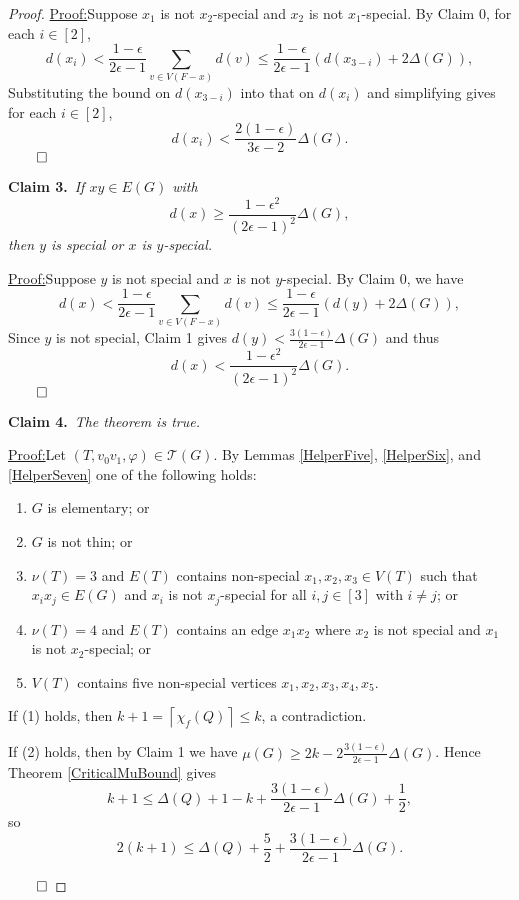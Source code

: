 \documentclass[12pt]{amsart}
\theoremstyle{plain}
\theoremstyle{definition}
\theoremstyle{remark}
\newcommand{\fancy}[1]{\mathcal{#1}}
\newcommand{\T}{\fancy{T}}
\newcommand{\ceil}[1]{\left\lceil#1\right\rceil}
\newcommand{\irange}[1]{\left[#1\right]}
\newcommand{\parens}[1]{\left( #1 \right)}
\newcommand{\vph}{\varphi}
\newcommand{\claim}[2]{{\noindent\bf Claim #1.}~{\it #2}~~}
\newenvironment{claimproof}[1]{\par\noindent\underline{Proof:}\space#1}{\leavevmode\unskip\penalty9999
\hbox{}\nobreak\hfill\quad\hbox{$\qed$}}
\begin{document}
\begin{proof}
\begin{claimproof}
Suppose $x_1$ is not $x_2$-special and $x_2$ is not $x_1$-special.  By Claim 0,
for each $i \in \irange{2}$,
\[d(x_i) < \frac{1-\epsilon}{2\epsilon -1}\sum_{v \in V(F-x)} d(v) \le
\frac{1-\epsilon}{2\epsilon -1}\parens{d(x_{3-i}) + 2\Delta(G)},\]
Substituting the bound on $d(x_{3-i})$ into that on $d(x_i)$ and simplifying
gives for each $i \in \irange{2}$,
\[d(x_i) < \frac{2(1-\epsilon)}{3\epsilon - 2}\Delta(G).\]
\end{claimproof}
\bigskip

\claim{3}{If $xy \in E(G)$ with \[d(x) \ge \frac{1 - \epsilon^2}{\parens{2\epsilon - 1}^2}\Delta(G),\] then $y$ is special or $x$ is $y$-special.}

\begin{claimproof}
Suppose $y$ is not special and $x$ is not $y$-special.  By Claim 0, we have
\[d(x) < \frac{1-\epsilon}{2\epsilon -1}\sum_{v \in V(F-x)} d(v) \le \frac{1-\epsilon}{2\epsilon -1}\parens{d(y) + 2\Delta(G)},\]
Since $y$ is not special, Claim 1 gives $d(y) < \frac{3(1-\epsilon)}{2\epsilon -1}\Delta(G)$ and thus
\[d(x) < \frac{1 - \epsilon^2}{\parens{2\epsilon - 1}^2}\Delta(G).\]
\end{claimproof}

\claim{4}{The theorem is true.}

\begin{claimproof}
Let $(T, v_0v_1, \vph) \in \T(G)$. By Lemmas \ref{HelperFive}, \ref{HelperSix},
and \ref{HelperSeven} one of the following holds:
\begin{enumerate}
\item $G$ is elementary; or
\item $G$ is not thin; or
\item $\nu(T) = 3$ and $E(T)$ contains non-special $x_1,x_2,x_3 \in V(T)$ such that $x_ix_j \in E(G)$ and $x_i$ is not $x_j$-special for all $i,j \in \irange{3}$ with $i \ne j$; or
\item $\nu(T) = 4$ and $E(T)$ contains an edge $x_1x_2$ where $x_2$ is not special and $x_1$ is not $x_2$-special; or
\item $V(T)$ contains five non-special vertices $x_1, x_2, x_3, x_4, x_5$.
\end{enumerate}

If (1) holds, then $k + 1 = \ceil{\chi_f(Q)} \le k$, a contradiction.

If (2) holds, then by Claim 1 we have $\mu(G) \ge 2k - 2\frac{3(1-\epsilon)}{2\epsilon -1}\Delta(G)$.  Hence Theorem \ref{CriticalMuBound} gives
\[k + 1 \le \Delta(Q) + 1 - k + \frac{3(1-\epsilon)}{2\epsilon -1}\Delta(G) + \frac12,\]
so
\[2(k + 1) \le \Delta(Q) + \frac52 + \frac{3(1-\epsilon)}{2\epsilon -1}\Delta(G).\]


\end{claimproof}
\end{proof}
\end{document}
